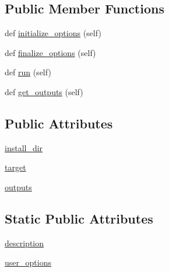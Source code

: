 \subsection*{Public Member Functions}
\begin{DoxyCompactItemize}
\item 
def \hyperlink{classsetuptools_1_1__distutils_1_1command_1_1install__egg__info_1_1install__egg__info_ad393578cbb4f83b4052ae07f86d40f8d}{initialize\+\_\+options} (self)
\item 
def \hyperlink{classsetuptools_1_1__distutils_1_1command_1_1install__egg__info_1_1install__egg__info_ab35ed01a6915c5f3d2f56186abed8a14}{finalize\+\_\+options} (self)
\item 
def \hyperlink{classsetuptools_1_1__distutils_1_1command_1_1install__egg__info_1_1install__egg__info_a6f03458344451625cbe09ca0f4e7bdc1}{run} (self)
\item 
def \hyperlink{classsetuptools_1_1__distutils_1_1command_1_1install__egg__info_1_1install__egg__info_a468a075641ed06ba27e4509e97313b0f}{get\+\_\+outputs} (self)
\end{DoxyCompactItemize}
\subsection*{Public Attributes}
\begin{DoxyCompactItemize}
\item 
\hyperlink{classsetuptools_1_1__distutils_1_1command_1_1install__egg__info_1_1install__egg__info_a524a316aec4e8bc732ee681452477138}{install\+\_\+dir}
\item 
\hyperlink{classsetuptools_1_1__distutils_1_1command_1_1install__egg__info_1_1install__egg__info_a1ad8365e4c0841d7a0db771dd466d88d}{target}
\item 
\hyperlink{classsetuptools_1_1__distutils_1_1command_1_1install__egg__info_1_1install__egg__info_a3f89167c1bfcd92bbfa56bfc0ccfa2aa}{outputs}
\end{DoxyCompactItemize}
\subsection*{Static Public Attributes}
\begin{DoxyCompactItemize}
\item 
\hyperlink{classsetuptools_1_1__distutils_1_1command_1_1install__egg__info_1_1install__egg__info_a8de9410a692ff3c670dfc0cd54ae20da}{description}
\item 
\hyperlink{classsetuptools_1_1__distutils_1_1command_1_1install__egg__info_1_1install__egg__info_a9eb3e05ec0c21af8eb447b33064d3f2c}{user\+\_\+options}
\end{DoxyCompactItemize}


